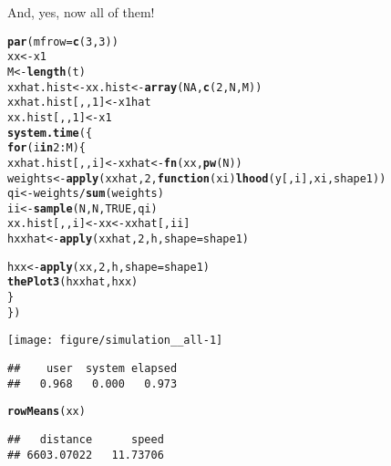 \documentclass[11pt]{article}\usepackage[]{graphicx}\usepackage[]{color}
\makeatletter
\def\maxwidth{ %
  \ifdim\Gin@nat@width>\linewidth
    \linewidth
  \else
    \Gin@nat@width
  \fi
}
\newcommand{\hlnum}[1]{\textcolor[rgb]{0.686,0.059,0.569}{#1}}%
\newcommand{\hlopt}[1]{\textcolor[rgb]{0,0,0}{#1}}%
\newcommand{\hlstd}[1]{\textcolor[rgb]{0.345,0.345,0.345}{#1}}%
\newcommand{\hlkwa}[1]{\textcolor[rgb]{0.161,0.373,0.58}{\textbf{#1}}}%
\newcommand{\hlkwb}[1]{\textcolor[rgb]{0.69,0.353,0.396}{#1}}%
\newcommand{\hlkwc}[1]{\textcolor[rgb]{0.333,0.667,0.333}{#1}}%
\newcommand{\hlkwd}[1]{\textcolor[rgb]{0.737,0.353,0.396}{\textbf{#1}}}%
\newenvironment{kframe}{%
 \def\at@end@of@kframe{}%
 \ifinner\ifhmode%
  \def\at@end@of@kframe{\end{minipage}}%
  \begin{minipage}{\columnwidth}%
 \fi\fi%
 \def\FrameCommand##1{\hskip\@totalleftmargin \hskip-\fboxsep
 \colorbox{shadecolor}{##1}\hskip-\fboxsep
     \hskip-\linewidth \hskip-\@totalleftmargin \hskip\columnwidth}%
 \MakeFramed {\advance\hsize-\width
   \@totalleftmargin\z@ \linewidth\hsize
   \@setminipage}}%
 {\par\unskip\endMakeFramed%
 \at@end@of@kframe}
\newenvironment{knitrout}{}{} %
\makeatother
\begin{document}
And, yes, now all of them!

\begin{knitrout}
\color{fgcolor}\begin{kframe}
\begin{alltt}
\hlkwd{par}\hlstd{(}\hlkwc{mfrow} \hlstd{=} \hlkwd{c}\hlstd{(}\hlnum{3}\hlstd{,} \hlnum{3}\hlstd{))}
\hlstd{xx} \hlkwb{<-} \hlstd{x1}
\hlstd{M} \hlkwb{<-} \hlkwd{length}\hlstd{(t)}
\hlstd{xxhat.hist} \hlkwb{<-} \hlstd{xx.hist} \hlkwb{<-} \hlkwd{array}\hlstd{(}\hlnum{NA}\hlstd{,} \hlkwd{c}\hlstd{(}\hlnum{2}\hlstd{, N, M))}
\hlstd{xxhat.hist[,,}\hlnum{1}\hlstd{]} \hlkwb{<-} \hlstd{x1hat}
\hlstd{xx.hist[,,}\hlnum{1}\hlstd{]} \hlkwb{<-} \hlstd{x1}
\hlkwd{system.time}\hlstd{(\{}
    \hlkwa{for} \hlstd{(i} \hlkwa{in} \hlnum{2}\hlopt{:}\hlstd{M) \{}
        \hlstd{xxhat.hist[,,i]} \hlkwb{<-} \hlstd{xxhat} \hlkwb{<-} \hlkwd{fn}\hlstd{(xx,} \hlkwd{pw}\hlstd{(N))}
        \hlstd{weights} \hlkwb{<-} \hlkwd{apply}\hlstd{(xxhat,} \hlnum{2}\hlstd{,} \hlkwa{function}\hlstd{(}\hlkwc{xi}\hlstd{)} \hlkwd{lhood}\hlstd{(y[, i], xi, shape1))}
        \hlstd{qi} \hlkwb{<-} \hlstd{weights} \hlopt{/} \hlkwd{sum}\hlstd{(weights)}
        \hlstd{ii} \hlkwb{<-} \hlkwd{sample}\hlstd{(N, N,} \hlnum{TRUE}\hlstd{, qi)}
        \hlstd{xx.hist[,,i]} \hlkwb{<-} \hlstd{xx} \hlkwb{<-} \hlstd{xxhat[, ii]}
        \hlstd{hxxhat} \hlkwb{<-} \hlkwd{apply}\hlstd{(xxhat,} \hlnum{2}\hlstd{, h,} \hlkwc{shape} \hlstd{= shape1)}

        \hlstd{hxx} \hlkwb{<-} \hlkwd{apply}\hlstd{(xx,} \hlnum{2}\hlstd{, h,} \hlkwc{shape} \hlstd{= shape1)}
        \hlkwd{thePlot3}\hlstd{(hxxhat, hxx)}
    \hlstd{\}}
\hlstd{\})}
\end{alltt}
\end{kframe}

{\centering \texttt{[image: figure/simulation\_\_all-1]} 

}


\begin{kframe}\begin{verbatim}
##    user  system elapsed 
##   0.968   0.000   0.973
\end{verbatim}
\begin{alltt}
\hlkwd{rowMeans}\hlstd{(xx)}
\end{alltt}
\begin{verbatim}
##   distance      speed 
## 6603.07022   11.73706
\end{verbatim}
\end{kframe}
\end{knitrout}
\end{document}
